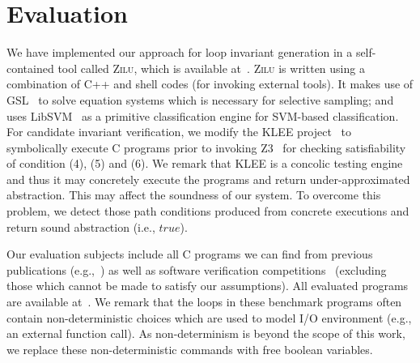\section{Evaluation} %
\label{sec:evaluations}
We have implemented our approach for loop invariant generation in a self-contained tool called \textsc{Zilu}, which is available at~\cite{zilu:repo}.
\textsc{Zilu} is written using a combination of C++ and shell codes (for invoking external tools). It makes use of GSL~\cite{gough2009gnu} to solve equation systems which is necessary for selective sampling; and uses LibSVM~\cite{chang2011libsvm} as a primitive classification engine for SVM-based classification. For candidate invariant verification, we modify the KLEE project~\cite{cadar2008klee} to symbolically execute C programs prior to invoking Z3~\cite{de2008z3} for checking satisfiability of
condition (4), (5) and (6). We remark that KLEE is a concolic testing engine and thus it may concretely execute the programs and return under-approximated abstraction. This may affect the soundness of our system.
To overcome this problem, we detect those path conditions produced from concrete executions and return sound abstraction (i.e., $true$). %

Our evaluation subjects include all C programs we can find from previous publications (e.g.,~\cite{DBLP:conf/pldi/GulwaniSV08,sharma2012interpolants,gulavani2008automatically,jeannet2010interproc}) as well as software verification competitions~\cite{beyer:SVCOMP:2013,Dirk:SVCOMP:2016} (excluding those which cannot be made to satisfy our assumptions). All evaluated programs are available at~\cite{zilu:benchmark}. We remark that the loops in these benchmark programs often contain non-deterministic choices which are used to model I/O environment (e.g., an external function call). As non-determinism is beyond the scope of this work, we replace these non-deterministic commands with free boolean variables.

